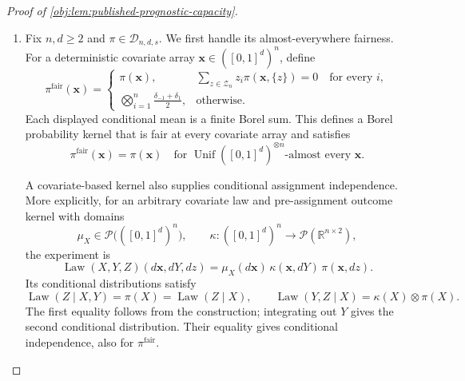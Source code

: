 \documentclass[11pt]{article}
\begin{document}
\begin{proof}[Proof of \cref{obj:lem:published-prognostic-capacity}]
\begin{enumerate}
The outcome diagonal distinguishes this law from every Gaussian completion:
\[
P_{\mathrm{tp}}\{O(0)=O(1)\}=1.
\]
Indeed, in the Gaussian construction, conditioning on \(U\) and \(\varepsilon_0\) gives
\[
\Pr_{P_m}\!\left(O(0)=O(1)\mid U,\varepsilon_0\right)
=
\Pr\!\left(\varepsilon_1=\varepsilon_0-\tau(U)\mid U,\varepsilon_0\right)
=0,
\]
because the independent Gaussian error \(\varepsilon_1\) assigns probability zero to every singleton. Integrating yields
\[
P_m\{O(0)=O(1)\}=0.
\]
Therefore
\[
P_{\mathrm{tp}}\notin\mathcal Q^{\mathrm G}_{d,s},
\qquad
\mathcal Q^{\mathrm G}_{d,s}\subsetneq\mathcal Q_{d,s}.
\]

\item\label{proof:published-prognostic-capacity:excess} Fix \(n,d\geq2\) and \(\pi\in\mathcal D_{n,d,s}\). We first handle its almost-everywhere fairness. For a deterministic covariate array \(\mathbf x\in([0,1]^d)^n\), define
\[
\pi^{\mathrm{fair}}(\mathbf x)=
\begin{cases}
\pi(\mathbf x),
&
\displaystyle
\sum_{z\in\mathcal Z_n}z_i\pi(\mathbf x,\{z\})=0
\quad\text{for every }i,\\[4pt]
\displaystyle
\bigotimes_{i=1}^n\frac{\delta_{-1}+\delta_1}{2},
&\text{otherwise}.
\end{cases}
\]
Each displayed conditional mean is a finite Borel sum. This defines a Borel probability kernel that is fair at every covariate array and satisfies
\[
\pi^{\mathrm{fair}}(\mathbf x)=\pi(\mathbf x)
\quad\text{for }
\operatorname{Unif}([0,1]^d)^{\otimes n}\text{-almost every }\mathbf x.
\]

A covariate-based kernel also supplies conditional assignment independence. More explicitly, for an arbitrary covariate law and pre-assignment outcome kernel with domains
\[
\mu_X\in\mathcal P\bigl(([0,1]^d)^n\bigr),
\qquad
\kappa:([0,1]^d)^n\longrightarrow\mathcal P(\mathbb R^{n\times2}),
\]
the experiment is
\[
\operatorname{Law}(X,Y,Z)(d\mathbf x,dY,dz)
=\mu_X(d\mathbf x)\,\kappa(\mathbf x,dY)\,\pi(\mathbf x,dz).
\]
Its conditional distributions satisfy
\[
\operatorname{Law}(Z\mid X,Y)=\pi(X)
=\operatorname{Law}(Z\mid X),
\qquad
\operatorname{Law}(Y,Z\mid X)=\kappa(X)\otimes\pi(X).
\]
The first equality follows from the construction; integrating out \(Y\) gives the second conditional distribution. Their equality gives conditional independence, also for \(\pi^{\mathrm{fair}}\).


\end{enumerate}
\end{proof}
\end{document}
